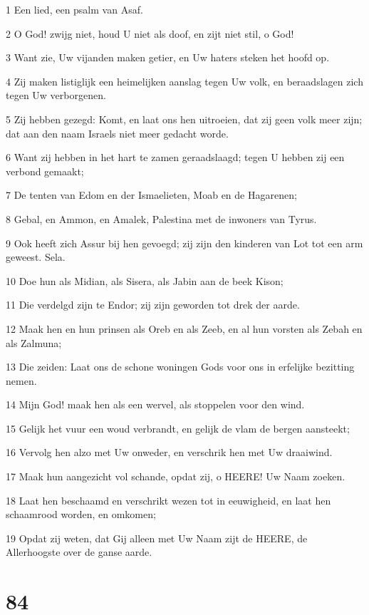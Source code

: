 \par 1 Een lied, een psalm van Asaf.
\par 2 O God! zwijg niet, houd U niet als doof, en zijt niet stil, o God!
\par 3 Want zie, Uw vijanden maken getier, en Uw haters steken het hoofd op.
\par 4 Zij maken listiglijk een heimelijken aanslag tegen Uw volk, en beraadslagen zich tegen Uw verborgenen.
\par 5 Zij hebben gezegd: Komt, en laat ons hen uitroeien, dat zij geen volk meer zijn; dat aan den naam Israels niet meer gedacht worde.
\par 6 Want zij hebben in het hart te zamen geraadslaagd; tegen U hebben zij een verbond gemaakt;
\par 7 De tenten van Edom en der Ismaelieten, Moab en de Hagarenen;
\par 8 Gebal, en Ammon, en Amalek, Palestina met de inwoners van Tyrus.
\par 9 Ook heeft zich Assur bij hen gevoegd; zij zijn den kinderen van Lot tot een arm geweest. Sela.
\par 10 Doe hun als Midian, als Sisera, als Jabin aan de beek Kison;
\par 11 Die verdelgd zijn te Endor; zij zijn geworden tot drek der aarde.
\par 12 Maak hen en hun prinsen als Oreb en als Zeeb, en al hun vorsten als Zebah en als Zalmuna;
\par 13 Die zeiden: Laat ons de schone woningen Gods voor ons in erfelijke bezitting nemen.
\par 14 Mijn God! maak hen als een wervel, als stoppelen voor den wind.
\par 15 Gelijk het vuur een woud verbrandt, en gelijk de vlam de bergen aansteekt;
\par 16 Vervolg hen alzo met Uw onweder, en verschrik hen met Uw draaiwind.
\par 17 Maak hun aangezicht vol schande, opdat zij, o HEERE! Uw Naam zoeken.
\par 18 Laat hen beschaamd en verschrikt wezen tot in eeuwigheid, en laat hen schaamrood worden, en omkomen;
\par 19 Opdat zij weten, dat Gij alleen met Uw Naam zijt de HEERE, de Allerhoogste over de ganse aarde.

\chapter{84}


